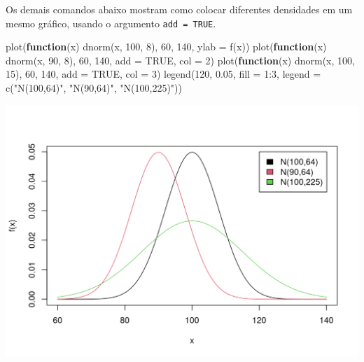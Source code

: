 \documentclass[
  10pt,
  a4paper]{book}
\newenvironment{Shaded}{\begin{snugshade}}{\end{snugshade}}
\newcommand{\AttributeTok}[1]{\textcolor[rgb]{0.77,0.63,0.00}{#1}}
\newcommand{\ConstantTok}[1]{\textcolor[rgb]{0.00,0.00,0.00}{#1}}
\newcommand{\ControlFlowTok}[1]{\textcolor[rgb]{0.13,0.29,0.53}{\textbf{#1}}}
\newcommand{\DecValTok}[1]{\textcolor[rgb]{0.00,0.00,0.81}{#1}}
\newcommand{\FloatTok}[1]{\textcolor[rgb]{0.00,0.00,0.81}{#1}}
\newcommand{\FunctionTok}[1]{\textcolor[rgb]{0.00,0.00,0.00}{#1}}
\newcommand{\NormalTok}[1]{#1}
\newcommand{\SpecialCharTok}[1]{\textcolor[rgb]{0.00,0.00,0.00}{#1}}
\newcommand{\StringTok}[1]{\textcolor[rgb]{0.31,0.60,0.02}{#1}}
\begin{document}
Os demais comandos abaixo mostram como colocar diferentes densidades em um
mesmo gráfico, usando o argumento \texttt{add\ =\ TRUE}.

\begin{Shaded}
\begin{Highlighting}[]
\FunctionTok{plot}\NormalTok{(}\ControlFlowTok{function}\NormalTok{(x) }\FunctionTok{dnorm}\NormalTok{(x, }\DecValTok{100}\NormalTok{, }\DecValTok{8}\NormalTok{), }\DecValTok{60}\NormalTok{, }\DecValTok{140}\NormalTok{, }\AttributeTok{ylab =} \StringTok{\textquotesingle{}f(x)\textquotesingle{}}\NormalTok{)}
\FunctionTok{plot}\NormalTok{(}\ControlFlowTok{function}\NormalTok{(x) }\FunctionTok{dnorm}\NormalTok{(x, }\DecValTok{90}\NormalTok{, }\DecValTok{8}\NormalTok{), }\DecValTok{60}\NormalTok{, }\DecValTok{140}\NormalTok{, }\AttributeTok{add =} \ConstantTok{TRUE}\NormalTok{, }\AttributeTok{col =} \DecValTok{2}\NormalTok{)}
\FunctionTok{plot}\NormalTok{(}\ControlFlowTok{function}\NormalTok{(x) }\FunctionTok{dnorm}\NormalTok{(x, }\DecValTok{100}\NormalTok{, }\DecValTok{15}\NormalTok{), }\DecValTok{60}\NormalTok{, }\DecValTok{140}\NormalTok{, }\AttributeTok{add =} \ConstantTok{TRUE}\NormalTok{, }\AttributeTok{col =} \DecValTok{3}\NormalTok{)}
\FunctionTok{legend}\NormalTok{(}\DecValTok{120}\NormalTok{, }\FloatTok{0.05}\NormalTok{, }\AttributeTok{fill =} \DecValTok{1}\SpecialCharTok{:}\DecValTok{3}\NormalTok{,}
       \AttributeTok{legend =} \FunctionTok{c}\NormalTok{(}\StringTok{"N(100,64)"}\NormalTok{, }\StringTok{"N(90,64)"}\NormalTok{, }\StringTok{"N(100,225)"}\NormalTok{))}
\end{Highlighting}
\end{Shaded}

\begin{center}\includegraphics{figures/unnamed-chunk-346-1} \end{center}
\end{document}
